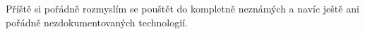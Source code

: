 \begin{conclusion}



Příště si pořádně rozmyslím se pouštět do kompletně neznámých a navíc ještě ani pořádně nezdokumentovaných technologií.


% 
% 
% 

\end{conclusion}
